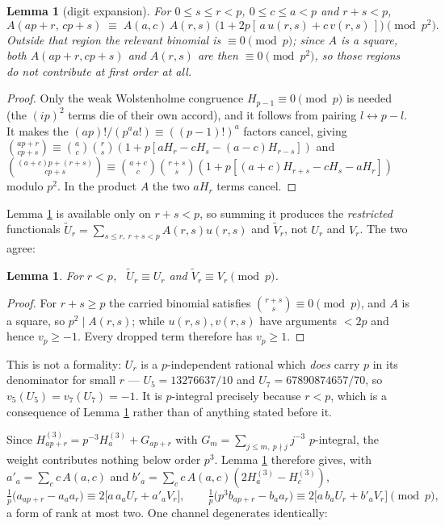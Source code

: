 \documentclass[11pt,a4paper]{amsart}
\theoremstyle{plain}
\newtheorem{lemma}[theorem]{Lemma}
\theoremstyle{definition}
\theoremstyle{remark}
\newcommand{\vp}{v_p}
\newcommand{\A}{A}
\begin{document}
\begin{lemma}[digit expansion]\label{lem:exp}
For $0\le s\le r<p$, $0\le c\le a<p$ and $r+s<p$,
\[
  \A(ap+r,\,cp+s)\;\equiv\;\A(a,c)\,\A(r,s)\,\bigl(1+2p[\,a\,u(r,s)+c\,v(r,s)\,]\bigr)\pmod{p^2}.
\]
Outside that region the relevant binomial is $\equiv0\pmod p$; since $\A$ is a square,
both $\A(ap+r,cp+s)$ and $\A(r,s)$ are then $\equiv0\pmod{p^2}$, so those regions do not
contribute at first order at all.
\end{lemma}

\begin{proof}
Only the weak Wolstenholme congruence $H_{p-1}\equiv0\pmod p$ is needed (the $(ip)^{2}$
terms die of their own accord), and it follows from pairing $l\leftrightarrow p-l$. It
makes the $(ap)!/(p^aa!)\equiv((p-1)!)^a$ factors cancel, giving
$\binom{ap+r}{cp+s}\equiv\binom ac\binom rs(1+p[aH_r-cH_s-(a-c)H_{r-s}])$ and
$\binom{(a+c)p+(r+s)}{cp+s}\equiv\binom{a+c}c\binom{r+s}s(1+p[(a+c)H_{r+s}-cH_s-aH_r])$
modulo $p^2$. In the product $\A$ the two $aH_r$ terms cancel.
\end{proof}

Lemma \ref{lem:exp} is available only on $r+s<p$, so summing it produces the
\emph{restricted} functionals $\widetilde U_r=\sum_{s\le r,\ r+s<p}\A(r,s)u(r,s)$ and
$\widetilde V_r$, not $U_r$ and $V_r$. The two agree:

\begin{lemma}\label{lem:restrict}
For $r<p$, \ $\widetilde U_r\equiv U_r$ and $\widetilde V_r\equiv V_r \pmod p$.
\end{lemma}

\begin{proof}
For $r+s\ge p$ the carried binomial satisfies $\binom{r+s}s\equiv0\pmod p$, and $\A$ is a
square, so $p^2\mid \A(r,s)$; while $u(r,s),v(r,s)$ have arguments $<2p$ and hence
$\vp\ge-1$. Every dropped term therefore has $\vp\ge1$.
\end{proof}

This is not a formality: $U_r$ is a $p$-independent rational which \emph{does} carry $p$ in
its denominator for small $r$ — $U_5=13276637/10$ and $U_7=67890874657/70$, so
$v_5(U_5)=v_7(U_7)=-1$. It is $p$-integral precisely because $r<p$, which is a consequence
of Lemma \ref{lem:restrict} rather than of anything stated before it.

Since $H^{(3)}_{ap+r}=p^{-3}H^{(3)}_a+G_{ap+r}$ with $G_m=\sum_{j\le m,\ p\nmid j}j^{-3}$
$p$-integral, the weight contributes nothing below order $p^3$. Lemma \ref{lem:exp}
therefore gives, with $a'_a=\sum_c c\,\A(a,c)$ and $b'_a=\sum_c c\,\A(a,c)(2H^{(3)}_a-H^{(3)}_c)$,
\[
  \tfrac1p\bigl(a_{ap+r}-a_aa_r\bigr)\equiv 2\bigl[a\,a_aU_r+a'_aV_r\bigr],
  \qquad
  \tfrac1p\bigl(p^3b_{ap+r}-b_aa_r\bigr)\equiv 2\bigl[a\,b_aU_r+b'_aV_r\bigr]
  \pmod p,
\]
a form of rank at most two. One channel degenerates identically:
\end{document}

